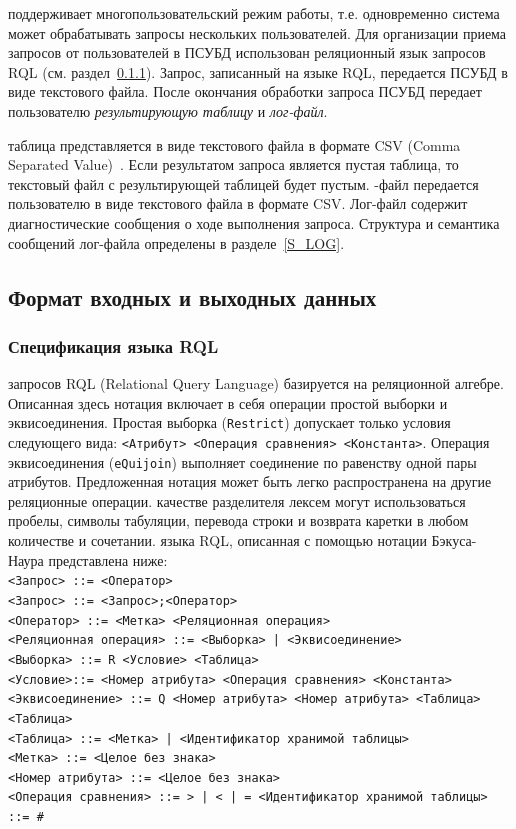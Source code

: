 \documentclass[11pt,oneside]{article}
\begin{document}
 поддерживает многопользовательский режим работы, т.е. одновременно система может обрабатывать запросы нескольких пользователей.
Для организации приема запросов от пользователей в ПСУБД использован реляционный язык запросов RQL (см. раздел~\ref{S_RQL}). Запрос, записанный на языке RQL, передается ПСУБД в виде текстового файла. После окончания обработки запроса ПСУБД передает пользователю \textit{результирующую таблицу} и \textit{лог-файл}.

 таблица представляется в виде текстового файла в формате CSV (Comma Separated Value)~\cite{B_RFC4180}. Если результатом запроса является пустая таблица, то текстовый файл с результирующей таблицей будет пустым.
-файл передается пользователю в виде текстового файла в формате CSV. Лог-файл содержит диагностические сообщения о ходе выполнения запроса. Структура и семантика сообщений лог-файла определены в разделе~\ref{S_LOG}.

\subsection{Формат входных и выходных данных}\label{S_InOutData}
\subsubsection{Спецификация языка RQL}\label{S_RQL}
 запросов RQL (Relational Query Language) базируется на реляционной алгебре. Описанная здесь нотация включает в себя операции простой выборки и эквисоединения. Простая выборка (\texttt{Restrict}) допускает только условия следующего вида: \texttt{<Атрибут> <Операция сравнения> <Константа>}. Операция эквисоединения (\texttt{eQuijoin}) выполняет соединение по равенству одной пары атрибутов. Предложенная нотация может быть легко распространена на другие реляционные операции.
 качестве разделителя лексем могут использоваться пробелы, символы табуляции, перевода строки и возврата каретки в любом количестве и сочетании.
 языка RQL, описанная с помощью нотации Бэкуса-Наура представлена ниже:\\
\texttt{<Запрос> ::= <Оператор>\\
<Запрос> ::= <Запрос>;<Оператор>\\
<Оператор> ::= <Метка> <Реляционная операция>\\
<Реляционная операция> ::= <Выборка> | <Эквисоединение>\\
<Выборка> ::= R <Условие> <Таблица>\\
<Условие>::= <Номер атрибута> <Операция сравнения> <Константа>\\
<Эквисоединение> ::= Q <Номер атрибута> <Номер атрибута> <Таблица> <Таблица>\\
<Таблица> ::= <Метка> | <Идентификатор хранимой таблицы>\\
<Метка> ::= <Целое без знака>\\
<Номер атрибута> ::= <Целое без знака>\\
<Операция сравнения> ::= > | < | = <Идентификатор хранимой таблицы> ::= \#<Целое без знака>
}
\end{document}
